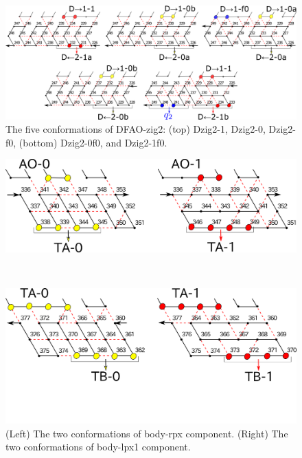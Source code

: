 \documentclass[runningheads]{llncs}
\begin{document}
\begin{figure}[h]
\includegraphics[width=\linewidth]{pic/DFAO-zig2.png}
  \caption{The five conformations of DFAO-zig2: (top) Dzig2-1, Dzig2-0, Dzig2-f0, (bottom) Dzig2-0f0, and Dzig2-1f0. }
  \label{fig:DFAO-zig2}
\end{figure} 


\begin{figure}[h]
\centering
\begin{minipage}{0.45\linewidth}
\centering
\includegraphics[width=\linewidth]{pic/body-rpx1.png}
\end{minipage}
\begin{minipage}{0.05\linewidth}
\ \\
\end{minipage}
\begin{minipage}{0.45\linewidth}
\centering
\includegraphics[width=\linewidth]{pic/body-lpx1.png}
\end{minipage}
\caption{(Left) The two conformations of body-rpx component. 
(Right) The two conformations of body-lpx1 component.}
\label{fig:body-rpx}
\end{figure}
\end{document}
